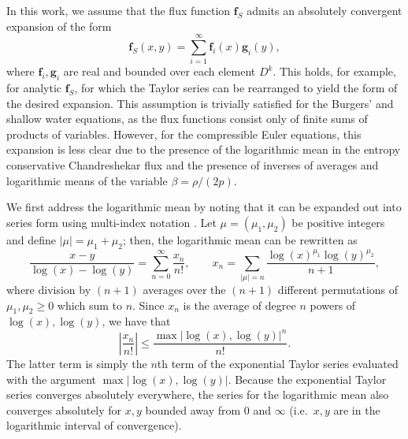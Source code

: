\documentclass[preprint,10pt]{article}
\theoremstyle{definition}
\theoremstyle{lemma}
\theoremstyle{theorem}
\theoremstyle{assumption}
\newcommand{\LRb}[1]{\left| #1 \right|}
\newcommand{\note}[1]{{\color{blue}{#1}}}
\begin{document}
In this work, we assume that the flux function $\bm{f}_S$ admits an absolutely convergent expansion of the form
\[
\bm{f}_S(x,y) = \sum_{i=1}^{\infty} \bm{f}_i(x) \bm{g}_i(y), 
\]
where $\bm{f}_i, \bm{g}_i$ are real and bounded over each element $D^k$.  This holds, for example, for analytic $\bm{f}_S$, for which the Taylor series can be rearranged to yield the form of the desired expansion.  This assumption is trivially satisfied for the Burgers' and shallow water equations, as the flux functions consist only of finite sums of products of variables.  However, for the compressible Euler equations, this expansion is less clear due to the presence of the logarithmic mean in the entropy conservative Chandreshekar flux and the presence of inverses of averages and logarithmic means of the variable $\beta = \rho/(2p)$.  


We first address the logarithmic mean by noting that it can be expanded out into series form using multi-index notation \cite{mustonen2002logarithmic}.  Let $\mu= (\mu_1,\mu_2)$ be positive integers and define $\LRb{\mu} = \mu_1 + \mu_2$; then, the logarithmic mean can be rewritten as
\[
\frac{x - y}{\log(x)-\log(y)} = \sum_{n=0}^{\infty} \frac{x_n}{n!}, \qquad x_n = \sum_{\LRb{\mu} = n} \frac{\log(x)^{\mu_1}\log(y)^{\mu_2}}{n+1},
\]
where division by $(n+1)$ averages over the $(n+1)$ different permutations of $\mu_1,\mu_2 \geq 0$ which sum to $n$.  
Since $x_n$ is the average of degree $n$ powers of $\log(x),\log(y)$, we have that
\[
\LRb{\frac{x_n}{n!}} \leq \frac{\max{\LRb{\log(x),\log(y)}}^n}{n!}. 
\]
The latter term is simply the $n$th term of the exponential Taylor series evaluated with the argument $\max{\LRb{\log(x),\log(y)}}$.  Because the exponential Taylor series converges absolutely everywhere, the series for the logarithmic mean also converges absolutely for $x,y$ bounded away from $0$ and $\infty$ (i.e.\ $x,y$ are in the logarithmic interval of convergence).  
\end{document}
